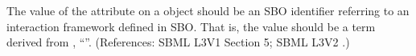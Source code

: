 The value of the attribute  on a \Model object should be an
SBO identifier referring to an interaction framework defined in SBO.  That
is, the value should be a term derived from \sbointeractionID,
``''.  (References: SBML L3V1 Section 5; SBML L3V2 .)
